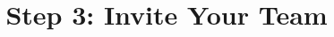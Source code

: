 \documentclass{article}
\begin{document}
\title{Step 3: Invite Your Team}

\maketitle
\end{document}
